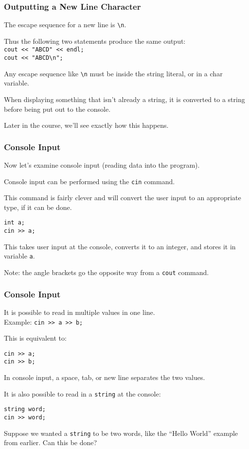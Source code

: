 \begin{frame}
\frametitle{Outputting a New Line Character}

The escape sequence for a new line is \texttt{\textbackslash n}.

Thus the following two statements produce the same output:\\
\texttt{cout << "ABCD" << endl;}\\
\texttt{cout << "ABCD\textbackslash n";}

Any escape sequence like \texttt{\textbackslash n} must be inside the string literal, or in a char variable.

When displaying something that isn't already a string, it is converted to a string before being put out to the console.

Later in the course, we'll see exactly how this happens.

\end{frame}


\begin{frame}[fragile]
\frametitle{Console Input}
Now let's examine console input (reading data into the program).

Console input can be performed using the \texttt{cin} command.

This command is fairly clever and will convert the user input to an appropriate type, if it can be done.

\begin{verbatim}
int a;
cin >> a;
\end{verbatim}


This takes user input at the console, converts it to an integer, and stores it in variable \texttt{a}.

Note: the angle brackets go the opposite way from a \texttt{cout} command.

\end{frame}


\begin{frame}[fragile]
\frametitle{Console Input}

It is possible to read in multiple values in one line.\\
\quad Example: \texttt{cin >> a >> b;}

This is equivalent to:\\
\begin{verbatim}
cin >> a;
cin >> b;
\end{verbatim}

In console input, a space, tab, or new line separates the two values.

It is also possible to read in a \texttt{string} at the console:
\begin{verbatim}
string word;
cin >> word;
\end{verbatim}

Suppose we wanted a \texttt{string} to be two words, like the ``Hello World'' example from earlier. Can this be done?

\end{frame}


